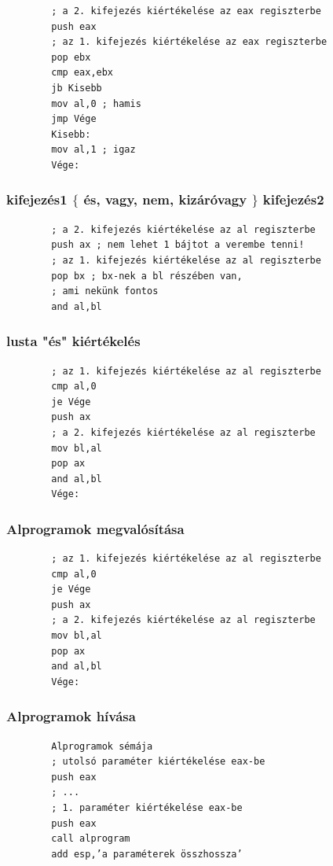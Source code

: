 \documentclass[margin=0px]{article}
\begin{document}
\begin{verbatim}
		; a 2. kifejezés kiértékelése az eax regiszterbe
		push eax
		; az 1. kifejezés kiértékelése az eax regiszterbe
		pop ebx
		cmp eax,ebx
		jb Kisebb
		mov al,0 ; hamis
		jmp Vége
		Kisebb:
		mov al,1 ; igaz
		Vége:
	\end{verbatim}

\subsubsection{kifejezés1 $ \lbrace $ és, vagy, nem, kizáróvagy  $ \rbrace $  kifejezés2 }

\begin{verbatim}
		; a 2. kifejezés kiértékelése az al regiszterbe
		push ax ; nem lehet 1 bájtot a verembe tenni!
		; az 1. kifejezés kiértékelése az al regiszterbe
		pop bx ; bx-nek a bl részében van,
		; ami nekünk fontos
		and al,bl
	\end{verbatim}

\subsubsection{ lusta "és" kiértékelés }

\begin{verbatim}
		; az 1. kifejezés kiértékelése az al regiszterbe
		cmp al,0
		je Vége
		push ax
		; a 2. kifejezés kiértékelése az al regiszterbe
		mov bl,al
		pop ax
		and al,bl
		Vége:
	\end{verbatim}


\subsubsection{ Alprogramok megvalósítása }


\begin{verbatim}
		; az 1. kifejezés kiértékelése az al regiszterbe
		cmp al,0
		je Vége
		push ax
		; a 2. kifejezés kiértékelése az al regiszterbe
		mov bl,al
		pop ax
		and al,bl
		Vége:
	\end{verbatim}

\subsubsection{ Alprogramok hívása }

\begin{verbatim}
		Alprogramok sémája
		; utolsó paraméter kiértékelése eax-be
		push eax
		; ...
		; 1. paraméter kiértékelése eax-be
		push eax
		call alprogram
		add esp,’a paraméterek összhossza’
	\end{verbatim}
\end{document}
